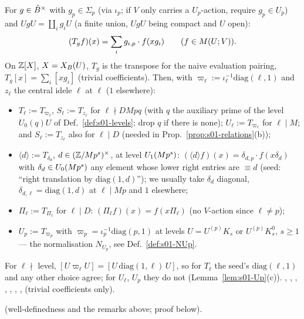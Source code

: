 \begin{definition}\label{def:s01-hecke}
For $g\in\hat{B}^\times$ with $g_p\in\Sigma_p$ (via $\iota_p$; if $V$ only carries a $U_p$-action, require $g_p\in U_p$) and
$UgU=\coprod_ig_iU$ (a finite union, $UgU$ being compact and $U$ open):
\[(T_gf)(x)=\sum_ig_{i,p}\cdot f(xg_i)\qquad(f\in M(U;V)).\]
On $\mathbb{Z}[X]$, $X=X_B(U)$, $T_g$ is the transpose for the naive evaluation pairing, $T_g[x]=\sum_i[xg_i]$ (trivial coefficients).
Then, with $\varpi_\ell:=\iota_\ell^{-1}\mathrm{diag}(\ell,1)$ and $z_\ell$ the central idele $\ell$ at $\ell$ ($1$ elsewhere):
\begin{itemize}
\item $T_\ell:=T_{\varpi_\ell}$, $S_\ell:=T_{z_\ell}$ for $\ell\nmid DMpq$ (with $q$ the auxiliary prime of the level $U_0(q)U$ of Def.~\ref{def:s01-levels}; drop $q$ if there is none); $U_\ell:=T_{\varpi_\ell}$ for $\ell\mid M$; and
  $S_\ell:=T_{z_\ell}$ also for $\ell\mid D$ (needed in Prop.~\ref{prop:s01-relations}(b));
\item $\langle d\rangle:=T_{\delta_d}$, $d\in(\mathbb{Z}/Mp^s)^\times$, at level $U_1(Mp^s)$: $(\langle d\rangle f)(x)=\delta_{d,p}\cdot f(x\delta_d)$ with
  $\delta_d\in U_0(Mp^s)$ any element whose lower right entries are $\equiv d$ (seed: ``right translation by $\mathrm{diag}(1,d)$'');
  we usually take $\delta_d$ diagonal, $\delta_{d,\ell}=\mathrm{diag}(1,d)$ at $\ell\mid Mp$ and $1$ elsewhere;
\item $\Pi_\ell:=T_{\Pi_\ell}$ for $\ell\mid D$: $(\Pi_\ell f)(x)=f(x\Pi_\ell)$ (no $V$-action since $\ell\ne p$);
\item $U_p:=T_{\varpi_p}$ with $\varpi_p=\iota_p^{-1}\mathrm{diag}(p,1)$ at levels $U=U^{(p)}K_s$ or $U^{(p)}K^0_s$, $s\ge1$ --- the
  normalisation $N_{U_p}$, see Def.~\ref{def:s01-NUp}.
\end{itemize}
For $\ell\nmid$ level, $[U\varpi_\ell U]=[U\,\mathrm{diag}(1,\ell)\,U]$, so for $T_\ell$ the seed's $\mathrm{diag}(\ell,1)$ and any other
choice agree; for $U_\ell$, $U_p$ they do not (Lemma~\ref{lem:s01-Up}(c)).
, , ,
, , ,
,  \stformal{} (trivial coefficients only).
\end{definition}
\noindent\stproved{} (well-definedness and the remarks above; proof below).
